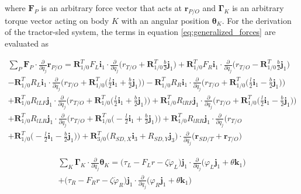 where $\mathbf{F}_P$ is an arbitrary force vector that acts at $\mathbf{r}_{P/O}$ and $\boldsymbol{\Gamma}_K$ is an arbitrary torque vector acting on body $K$ with an angular position $\boldsymbol{\theta}_K$. For the derivation of the tractor-sled system, the terms in equation \ref{eq:generalized_forces} are evaluated as
\begin{linenomath*}
\begin{multline}
    \sum_{P}^{} \mathbf{F}_P\cdot \frac{\partial}{\partial q_j}\mathbf{r}_{P/O}
    = \mathbf{R}_{1/0}^T F_L \mathbf{i}_1 \cdot \frac{\partial}{\partial q_j}\Big(r_{T/O} + \mathbf{R}_{1/0}^T\frac{b}{2}\mathbf{j}_1\Big)
    + \mathbf{R}_{1/0}^T F_R \mathbf{i}_1 \cdot \frac{\partial}{\partial q_j}\Big(r_{T/O} - \mathbf{R}_{1/0}^T\frac{b}{2}\mathbf{j}_1\Big) \\
    - \mathbf{R}_{1/0}^T R_L \mathbf{i}_1 \cdot \frac{\partial}{\partial q_j}\Big(r_{T/O} + \mathbf{R}_{1/0}^T\Big(\frac{l}{2}\mathbf{i}_1 + \frac{b}{2}\mathbf{j}_1\Big)\Big) 
    - \mathbf{R}_{1/0}^T R_R \mathbf{i}_1 \cdot \frac{\partial}{\partial q_j}\Big(r_{T/O} + \mathbf{R}_{1/0}^T\Big(\frac{l}{2}\mathbf{i}_1 - \frac{b}{2}\mathbf{j}_1\Big)\Big) \\
    + \mathbf{R}_{1/0}^T R_{lLF} \mathbf{j}_1 \cdot \frac{\partial}{\partial q_j}\Big(r_{T/O} + \mathbf{R}_{1/0}^T\Big(\frac{l}{2}\mathbf{i}_1 + \frac{b}{2}\mathbf{j}_1\Big)\Big)
    + \mathbf{R}_{1/0}^T R_{lRF} \mathbf{j}_1 \cdot \frac{\partial}{\partial q_j}\Big(r_{T/O} + \mathbf{R}_{1/0}^T\Big(\frac{l}{2}\mathbf{i}_1 - \frac{b}{2}\mathbf{j}_1\Big)\Big) \\
    + \mathbf{R}_{1/0}^T R_{lLR} \mathbf{j}_1 \cdot \frac{\partial}{\partial q_j}\Big(r_{T/O} + \mathbf{R}_{1/0}^T\Big(-\frac{l}{2}\mathbf{i}_1 + \frac{b}{2}\mathbf{j}_1\Big)\Big)
    + \mathbf{R}_{1/0}^T R_{lRR} \mathbf{j}_1 \cdot \frac{\partial}{\partial q_j}\Big(r_{T/O} \\
    + \mathbf{R}_{1/0}^T\Big(-\frac{l}{2}\mathbf{i}_1 - \frac{b}{2}\mathbf{j}_1\Big)\Big) 
    + \mathbf{R}_{3/0}^T\Big(R_{SD,X}\mathbf{i}_3 + R_{SD,Y}\mathbf{j}_3\Big) \cdot \frac{\partial}{\partial q_j}\Big(\mathbf{r}_{SD/T} + \mathbf{r}_{T/O}\Big)
\end{multline}
\end{linenomath*}
\vspace{-25pt}
\begin{linenomath*}
    \begin{multline}
          \sum_{K}^{} \boldsymbol{\Gamma}_K\cdot\frac{\partial}{\partial q_j}\boldsymbol{\theta}_K = \Big(\tau_L - F_Lr - \zeta\dot\varphi_L\Big)\mathbf{j}_1 \cdot \frac{\partial}{\partial q_j}\Big(\varphi_L\mathbf{j}_1 + \theta\mathbf{k}_1 \Big) \\ + \Big( \tau_R - F_Rr - \zeta\dot\varphi_R \Big)\mathbf{j}_1 \cdot \frac{\partial}{\partial q_j}\Big(\varphi_R\mathbf{j}_1 + \theta\mathbf{k}_1 \Big)
    \end{multline}
\end{linenomath*}
